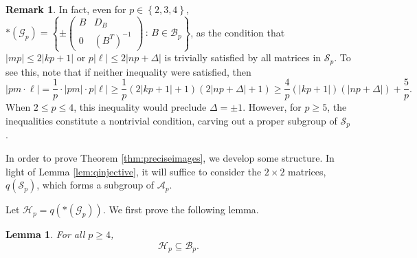 \documentclass{amsart}     %
\newcommand{\set}[1]{ \left\{ #1 \right\} }
\newtheorem{lem}[thm]{Lemma}          %
\theoremstyle{definition}
\newtheorem{rem}{Remark}             %
\begin{document}
\begin{rem} \label{rem:inequalitytrivial} In fact, even for $p \in \set{2, 3, 4}$, $*(\mathcal{G}_p) = \set{ \pm \begin{pmatrix} B & D_B \\ 0 & (B^T)^{-1} \end{pmatrix} \, : \, B \in \mathcal{B}_p }$, as the condition that $|mp | \leq 2|kp + 1|$ or $p| \ell |  \leq  2 | np + \Delta |$ is trivially satisfied by all matrices in $\mathcal{S}_p$. To see this, note that if neither inequality were satisfied, then 
\[|pm \cdot \ell| = \frac{1}{p} \cdot |pm| \cdot p| \ell | \geq \frac{1}{p} ( 2|kp+1| + 1)( 2|np+\Delta| + 1 ) \geq \frac{4}{p} (|kp+1|)( |np+\Delta| ) + \frac{5}{p}.\] When $2 \leq p \leq 4$, this inequality would preclude $\Delta = \pm 1$. However, for $p \geq 5$, the inequalities constitute a nontrivial condition, carving out a proper subgroup of $\mathcal{S}_p$. 
\end{rem}

In order to prove Theorem \ref{thm:preciseimages}, we develop some structure. In light of Lemma \ref{lem:qinjective}, it will suffice to consider the $2 \times 2$ matrices, $q(\mathcal{S}_p)$, which forms a subgroup of $\mathcal{A}_p$. 

Let $\mathcal{H}_p = q\left( *(\mathcal{G}_p) \right)$. We first prove the following lemma.

\begin{lem} \label{lem:inequalities} For all $p \geq 4$,  \[\mathcal{H}_p \subseteq  \mathcal{B}_p .\]
\end{lem} 
\end{document}
